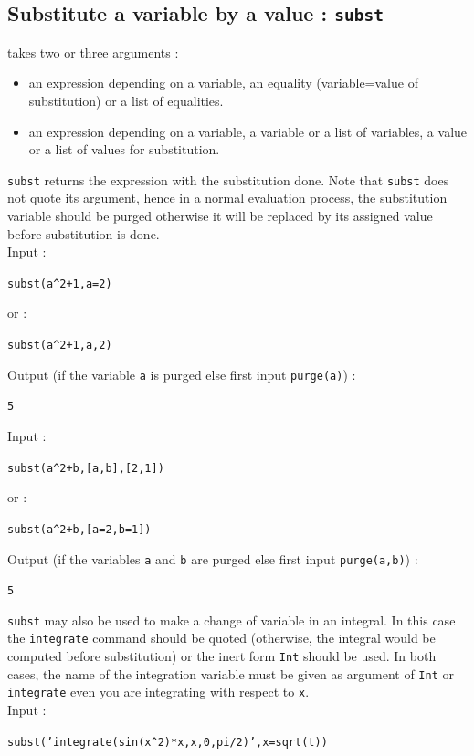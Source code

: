 \documentclass[a4paper,11pt]{book}
\begin{document}
\subsection{Substitute a variable by a value : {\tt subst}}\label{sec:subst}
 takes two or three arguments : 
\begin{itemize}
\item an expression depending on a variable,
an equality (variable=value of substitution) or a list of equalities.
\item an expression depending on a variable, a variable or a list
of variables, a value or a list of values for substitution.
\end{itemize}
{\tt subst} returns the expression with the substitution done.
Note that {\tt subst} does not quote its argument, hence
in a normal evaluation process, the substitution variable should
be purged otherwise it will be replaced by its assigned value
before substitution is done.\\
Input :
\begin{center}{\tt subst(a\verb|^|2+1,a=2)}\end{center} 
or :
\begin{center}{\tt subst(a\verb|^|2+1,a,2)}\end{center} 
Output (if the variable {\tt a} is purged else first input {\tt purge(a)}) :
\begin{center}{\tt 5}\end{center} 
Input :
\begin{center}{\tt subst(a\verb|^|2+b,[a,b],[2,1])}\end{center} 
or :
\begin{center}{\tt subst(a\verb|^|2+b,[a=2,b=1])}\end{center} 
Output  (if the variables {\tt a} and {\tt b} are purged else first input 
{\tt purge(a,b)}) :
 \begin{center}{\tt 5}\end{center}
{\tt subst} may also be used to make a change of variable in an integral. 
In this case the {\tt integrate} command should be quoted 
(otherwise, the integral would be computed before substitution) or
the inert form {\tt Int} should be used.
In both cases, the name of the integration variable must be given as
argument of {\tt Int} or {\tt integrate} even you are integrating
with respect to {\tt x}.\\
Input :
\begin{center}{\tt subst('integrate(sin(x\verb|^|2)*x,x,0,pi/2)',x=sqrt(t))}\end{center}
\end{document}
